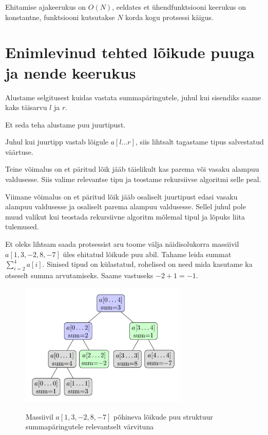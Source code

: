 \documentclass{trkut}
\theoremstyle{definition}
\begin{document}
Ehitamise ajakeerukus on $O(N)$, eeldates et ühendfunktsiooni keerukus on konstantne, funktsiooni kutsutakse $N$ korda kogu protsessi käigus. \parencite{EMaxx}


\section{Enimlevinud tehted lõikude puuga ja nende keerukus}
Alustame selgitusest kuidas vastata summapäringutele, juhul kui sisendiks saame kaks täisarvu $l$ ja $r$.

Et seda teha alustame puu juurtipust. 

Juhul kui juurtipp vastab lõigule $a[l...r]$, siis lihtsalt tagastame tipus salvestatud väärtuse. \parencite{EMaxx}

Teine võimalus on et päritud lõik jääb täielikult kas parema või vasaku alampuu valdusesse. Siis valime relevantse tipu ja teostame rekursiivse algoritmi selle peal. \parencite{EMaxx}

Viimane võimalus on et päritud lõik jääb osaliselt juurtipust edasi vasaku alampuu valdusesse ja osaliselt parema alampuu valdusesse. Sellel juhul pole muud valikut kui teostada rekursiivne algoritm mõlemal tipul ja lõpuks liita tulemused. \parencite{EMaxx}

Et oleks lihtsam saada protsessist aru toome välja näidisolukorra massiivil $a[1,3,-2,8,-7]$ üles ehitatud lõikude puu abil. 
Tahame leida summat $\sum_{i=2}^{4} {a[i]}$.
Sinised tipud on külastatud, rohelised on need mida kasutame ka otseselt summa arvutamiseks.
Saame vastuseks $-2+1=-1$. \parencite{EMaxx}

\begin{figure}[H]%
    \includegraphics[width=8cm]{SLPUU.png}%
    \caption{Massiivil $a[1,3,-2,8,-7]$ põhineva lõikude puu struktuur summapäringutele relevantselt värvituna}%
    \label{joonislol}%
\end{figure}
\end{document}
